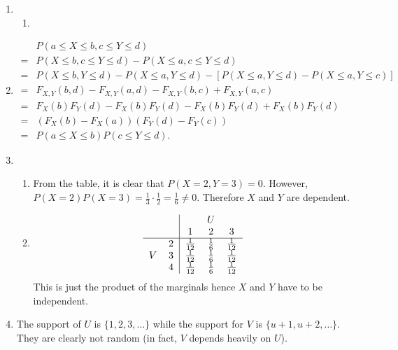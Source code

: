\documentclass{article}
\begin{document}
\begin{enumerate}
    \item \begin{enumerate}
        \item 
    \end{enumerate}

    \item \begin{align*}
        & P(a \leq X \leq b, c \leq Y \leq d) \\
        =& P(X \leq b, c \leq Y \leq d) - P(X \leq a, c \leq Y \leq d) \\
        =& P(X \leq b, Y \leq d) - P(X \leq a, Y \leq d) 
        - [ P(X \leq a, Y \leq d) - P(X \leq a, Y \leq c)] \\
        =& F_{X, Y}(b, d) - F_{X, Y}(a, d) - F_{X, Y}(b, c) + F_{X, Y}(a, c) \\
        =& F_X(b)F_Y(d) - F_X(b)F_Y(d) - F_X(b)F_Y(d) + F_X(b)F_Y(d) \\
        =& (F_X(b) - F_X(a))(F_Y(d) - F_Y(c)) \\
        =& P(a \leq X \leq b) P(c \leq Y \leq d).
    \end{align*}

    \item \begin{enumerate}
        \item From the table, it is clear that $P(X = 2, Y = 3) = 0$. However, 
        $P(X = 2)P(X = 3) = \frac{1}{3} \cdot \frac{1}{2} = \frac{1}{6} \neq 0$. Therefore $X$ and $Y$ 
        are dependent.

        \item \[ \begin{tabular}{c c | c c c}
            &  &  & $U$ & \\
            &  & 1 & 2 & 3 \\
            \hline
            & 2 & $\frac{1}{12}$ & $\frac{1}{6}$ & $\frac{1}{12}$ \\
            $V$ & 3 & $\frac{1}{12}$ & $\frac{1}{6}$ & $\frac{1}{12}$ \\
            & 4 & $\frac{1}{12}$ & $\frac{1}{6}$ & $\frac{1}{12}$
        \end{tabular} \]
        This is just the product of the marginals hence $X$ and $Y$ have to be independent.
    \end{enumerate}

    \item The support of $U$ is $\{1, 2, 3, \dots\}$ while the support for $V$ is $\{u + 1, u + 2, 
    \dots\}$. They are clearly not random (in fact, $V$ depends heavily on $U$).


\end{enumerate}
\end{document}
